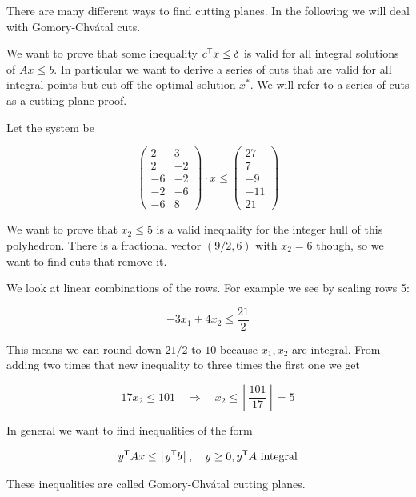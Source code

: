 There are many different ways to find cutting planes. In the following we will deal with Gomory-Chv\'{a}tal cuts.

We want to prove that some inequality ${c}^\text{\upshape \sffamily T}x\leq \delta$ is valid for all integral solutions of $Ax\leq b$. In particular we want to derive a series of cuts that are valid for all integral points but cut off the optimal solution $x^*$. We will refer to a series of cuts as a cutting plane proof.

\begin{Ex}
Let the system be

\[\begin{pmatrix}
2 & 3\\
2 & -2 \\
-6 & -2\\
-2 & -6\\
-6 & 8
\end{pmatrix}\cdot x \leq \begin{pmatrix} 27\\7\\-9\\-11\\21\end{pmatrix}\]

We want to prove that $x_2\leq 5$ is a valid inequality for the integer hull of this polyhedron. There is a fractional vector $(9/2,6)$ with $x_2=6$ though, so we want to find cuts that remove it.

We look at linear combinations of the rows. For example we see by scaling rows 5:

\[-3x_1+4x_2 \leq \frac{21}{2}\]

This means we can round down $21/2$ to $10$ because $x_1,x_2$ are integral. From adding two times that new inequality to three times the first one we get

\[17x_2 \leq 101 \quad \Rightarrow \quad x_2 \leq \left\lfloor \frac{101}{17}\right\rfloor = 5\]
\end{Ex}

In general we want to find inequalities of the form

\[{y}^\text{\upshape \sffamily T} A x \leq \left\lfloor {y}^\text{\upshape \sffamily T} b \right \rfloor,\quad y\geq 0, {y}^\text{\upshape \sffamily T} A \text{ integral}\]

These inequalities are called Gomory-Chv\'{a}tal cutting planes.

